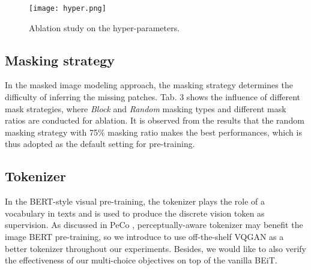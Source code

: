 \documentclass[runningheads]{llncs}
\begin{document}
\begin{figure}[H]
\begin{center}
\texttt{[image: hyper.png]}
\caption{Ablation study on the hyper-parameters.}
\label{fig:hyper}
\end{center}
\end{figure}









\subsection{Masking strategy}
In the masked image modeling approach, the masking strategy determines the difficulty of inferring the missing patches. Tab. 3 shows the influence of different mask strategies, where \textit{Block} and \textit{Random} masking types and different mask ratios are conducted for ablation. It is observed from the results that the random masking strategy with 75\% masking ratio makes the best performances, which is thus adopted as the default setting for pre-training.



\begin{table}[t]
\small
\centering
\caption{Ablation study on different masking strategies.}
\label{table:pacs}

\end{table}


\subsection{Tokenizer}

In the BERT-style visual pre-training, the tokenizer plays the role of a vocabulary in texts and is used to produce the discrete vision token as supervision. As discussed in PeCo \cite{peco}, perceptually-aware tokenizer may benefit the image BERT pre-training, so we introduce to use off-the-shelf VQGAN \cite{taming} as a better tokenizer throughout our experiments. Besides, we would like to also verify the effectiveness of our multi-choice objectives on top of the vanilla BEiT.
\end{document}
